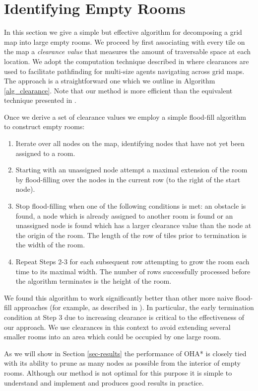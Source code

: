 \section{Identifying Empty Rooms}
\label{empty rooms}
In this section we give a simple but effective algorithm for decomposing a grid map
into large empty rooms.
We proceed by first associating with every tile on the map a \emph{clearance value} 
that measures the amount of traversable space at each location.
We adopt the computation technique described in \cite{harabor08} where clearances
are used to facilitate pathfinding for multi-size agents navigating across grid maps.
The approach is a straightforward one which we outline in Algorithm \ref{alg_clearance}.
Note that our method is more efficient than the equivalent technique presented
in \cite{harabor08}.



Once we derive a set of clearance values we employ a simple flood-fill algorithm to 
construct empty rooms:

\begin{enumerate}
\item{Iterate over all nodes on the map, identifying nodes that have not yet 
been assigned to a room.}
\item{Starting with an unassigned node attempt a maximal extension of the room
by flood-filling over the nodes in the current row (to the right of the start node).}
\item{Stop flood-filling when one of the following conditions is met: an obstacle is found,
a node which is already assigned to another room is found or an unassigned
node is found which has a larger clearance value than the node at the origin of the room.
The length of the row of tiles prior to termination is the width of the room.}
\item{Repeat Steps 2-3 for each subsequent row attempting to grow the room
each time to its maximal width.
The number of rows successfully processed before the algorithm terminates is the height of the room.}
\end{enumerate}

We found this algorithm to work significantly better than other more naive flood-fill
approaches (for example, as described in \cite{bjornsson06}). 
In particular, the early termination condition at Step 3 
due to increasing clearance is critical to the effectiveness of our approach.
We use clearances in this context to avoid extending several smaller rooms into an area which
could be occupied by one large room.

As we will show in Section \ref{sec-results} the performance of OHA* is closely
tied with its ability to prune as many nodes as possible from the interior of 
empty rooms. 
Although our method is not optimal for this purpose it is simple
to understand and implement and produces good results in practice.
